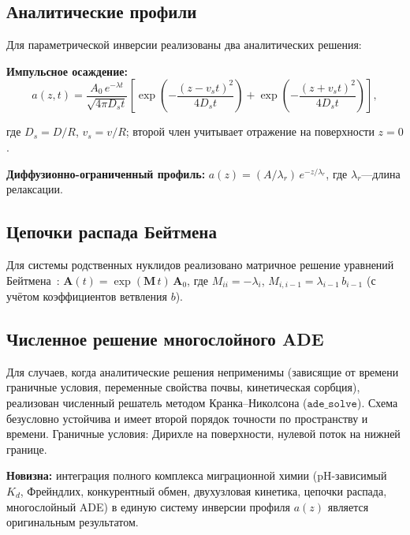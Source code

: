 \documentclass[12pt,a4paper]{article}
\begin{document}
\subsection{Аналитические профили}
\label{sub:profiles}

Для параметрической инверсии реализованы два аналитических решения:

\textbf{Импульсное осаждение:}
\begin{equation}
  a(z, t) = \frac{A_0\, e^{-\lambda t}}{\sqrt{4\pi D_s t}}
  \left[\exp\!\left(-\frac{(z - v_s t)^2}{4 D_s t}\right)
  + \exp\!\left(-\frac{(z + v_s t)^2}{4 D_s t}\right)\right],
  \label{eq:pulse}
\end{equation}

где $D_s = D/R$, $v_s = v/R$; второй член учитывает отражение
на поверхности $z = 0$.

\textbf{Диффузионно-ограниченный профиль:}
$a(z) = (A/\lambda_r)\, e^{-z/\lambda_r}$, где $\lambda_r$---длина
релаксации.

\subsection{Цепочки распада Бейтмена}
\label{sub:bateman}

Для системы родственных нуклидов реализовано матричное решение
уравнений Бейтмена~\citep{Bateman1910}:
$\mathbf{A}(t) = \exp(\mathbf{M}\, t)\,\mathbf{A}_0$,
где $M_{ii} = -\lambda_i$, $M_{i,i-1} = \lambda_{i-1}\, b_{i-1}$
(с учётом коэффициентов ветвления $b$).

\subsection{Численное решение многослойного ADE}
\label{sub:ade_solver}

Для случаев, когда аналитические решения неприменимы
(зависящие от времени граничные условия, переменные
свойства почвы, кинетическая сорбция), реализован
численный решатель методом Кранка--Николсона ($\texttt{ade\_solve}$).
Схема безусловно устойчива и имеет второй порядок точности
по пространству и времени.
Граничные условия: Дирихле на поверхности, нулевой поток
на нижней границе.

\textbf{Новизна:} интеграция полного комплекса миграционной химии
(pH-зависимый $K_d$, Фрейндлих, конкурентный обмен,
двухузловая кинетика, цепочки распада, многослойный ADE)
в единую систему инверсии профиля $a(z)$ является
оригинальным результатом.


\end{document}
